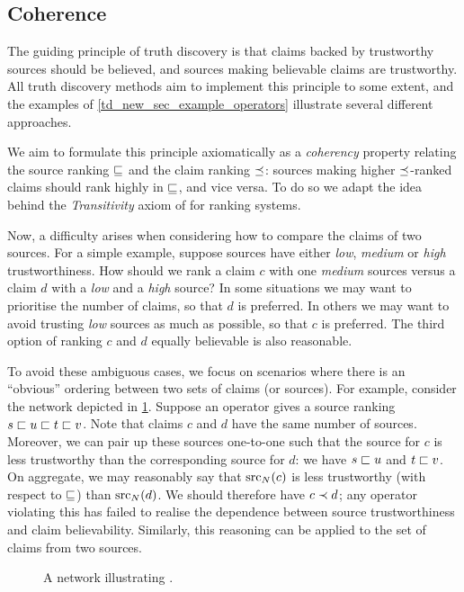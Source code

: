 \subsection{Coherence}
\label{td_new_sec_coherence}

The guiding principle of truth discovery is that claims backed by trustworthy
sources should be believed, and sources making believable claims are
trustworthy. All truth discovery methods aim to implement this principle to
some extent, and the examples of \cref{td_new_sec_example_operators} illustrate
several different approaches.

We aim to formulate this principle axiomatically as a \emph{coherency} property
relating the source ranking $\sqsubseteq$ and the claim ranking $\preceq$: sources making
higher $\preceq$-ranked claims should rank highly in $\sqsubseteq$, and vice versa. To do
so we adapt the idea behind the \emph{Transitivity} axiom of
\textcite{altman2008} for ranking systems.

Now, a difficulty arises when considering how to compare the claims of two
sources. For a simple example, suppose sources have either \emph{low},
\emph{medium} or \emph{high} trustworthiness. How should we rank a claim $c$
with one \emph{medium} sources versus a claim $d$ with a \emph{low} and a
\emph{high} source? In some situations we may want to prioritise the number of
claims, so that $d$ is preferred. In others we may want to avoid trusting
\emph{low} sources as much as possible, so that $c$ is preferred. The third
option of ranking $c$ and $d$ equally believable is also reasonable.

To avoid these ambiguous cases, we focus on scenarios where there is an
``obvious'' ordering between two sets of claims (or sources). For example,
consider the network depicted in \cref{td_new_fig_coherence_intro}. Suppose an
operator gives a source ranking $s \sqsubset u \sqsubset t \sqsubset v$. Note that claims $c$
and $d$ have the same number of sources. Moreover, we can pair up these sources
one-to-one such that the source for $c$ is less trustworthy than the
corresponding source for $d$: we have $s \sqsubset u$ and $t \sqsubset v$. On aggregate,
we may reasonably say that $\operatorname{src}_N(c)$ is less trustworthy (with respect to
$\sqsubseteq$) than $\operatorname{src}_N(d)$. We should therefore have $c \prec d$; any operator
violating this has failed to realise the dependence between source
trustworthiness and claim believability. Similarly, this reasoning can be
applied to the set of claims from two sources.

\begin{figure}
    \centering

    \caption{
        A network illustrating \claimcoherence{}.
    }
    \label{td_new_fig_coherence_intro}
\end{figure}


